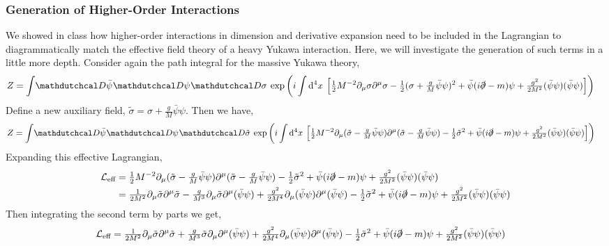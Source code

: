 \documentclass[12pt]{article}
\begin{document}
\subsubsection{Generation of Higher-Order Interactions}

We showed in class how higher-order interactions in dimension and derivative expansion need to be included in the Lagrangian to diagrammatically match the effective field theory of a heavy Yukawa  interaction. Here, we will investigate the generation of such terms in a little more depth. Consider again the path integral for the massive Yukawa theory,
\begin{align*}
Z 
& = \int \pathd{\bar{\psi}} \pathd{\psi} \pathd{\sigma} \exp{\left( i \int \dn{4}{x} \left[ \tfrac{1}{2} M^{-2} \partial_\mu \sigma \partial^\mu \sigma - \tfrac{1}{2} (\sigma + \tfrac{g}{M} \bar{\psi} \psi)^2 + \bar{\psi} (i \slashed{\partial} - m)\psi  + \tfrac{g^2}{2M^2} (\bar{\psi} \psi)(\bar{\psi} \psi) \right] \right)}
\end{align*}
Define a new auxiliary field, $\tilde{\sigma} = \sigma + \tfrac{g}{M} \bar{\psi} \psi$. Then we have,
\begin{align*}
Z & = \int \pathd{\bar{\psi}} \pathd{\psi} \pathd{\tilde{\sigma}} \exp{\left( i \int \dn{4}{x} \left[ \tfrac{1}{2} M^{-2} \partial_\mu (\tilde{\sigma}  - \tfrac{g}{M} \bar{\psi} \psi) \partial^\mu (\tilde{\sigma} - \tfrac{g}{M} \bar{\psi} \psi) - \tfrac{1}{2} \tilde{\sigma}^2 + \bar{\psi} (i \slashed{\partial} - m)\psi + \tfrac{g^2}{2M^2} (\bar{\psi} \psi)(\bar{\psi} \psi) \right] \right)}
\end{align*}
Expanding this effective Lagrangian,
\begin{align*}
\mathcal{L}_{\text{eff}} & = \tfrac{1}{2} M^{-2} \partial_\mu (\tilde{\sigma}  - \tfrac{g}{M} \bar{\psi} \psi) \partial^\mu (\tilde{\sigma} - \tfrac{g}{M} \bar{\psi} \psi) - \tfrac{1}{2} \tilde{\sigma}^2 + \bar{\psi} (i \slashed{\partial} - m)\psi + \tfrac{g^2}{2M^2} (\bar{\psi} \psi)(\bar{\psi} \psi)
\\
& = \tfrac{1}{2M^2} \partial_\mu \tilde{\sigma} \partial^\mu \tilde{\sigma} - \tfrac{g}{M^3} \partial_\mu \tilde{\sigma} \partial^\mu (\bar{\psi} \psi) + \tfrac{g^2}{2M^4} \partial_\mu (\bar{\psi} \psi) \partial^\mu (\bar{\psi} \psi) - \tfrac{1}{2} \tilde{\sigma}^2 + \bar{\psi} (i \slashed{\partial} - m)\psi + \tfrac{g^2}{2M^2} (\bar{\psi} \psi)(\bar{\psi} \psi)
\end{align*}
Then integrating the second term by parts we get,
\begin{align*}
\mathcal{L}_{\text{eff}} 
& = \tfrac{1}{2M^2} \partial_\mu \tilde{\sigma} \partial^\mu \tilde{\sigma} + \tfrac{g}{M^3} \tilde{\sigma} \partial_\mu  \partial^\mu (\bar{\psi} \psi) + \tfrac{g^2}{2M^4} \partial_\mu (\bar{\psi} \psi) \partial^\mu (\bar{\psi} \psi) - \tfrac{1}{2} \tilde{\sigma}^2 + \bar{\psi} (i \slashed{\partial} - m)\psi + \tfrac{g^2}{2M^2} (\bar{\psi} \psi)(\bar{\psi} \psi)
\end{align*}
\end{document}
